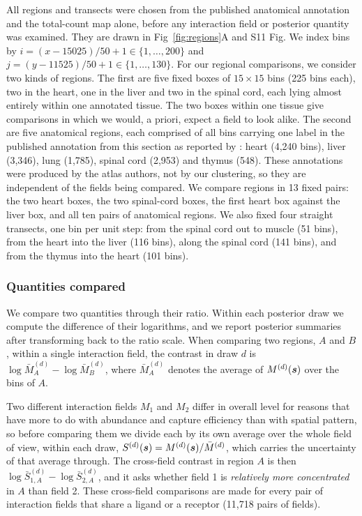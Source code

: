 \documentclass[10pt,letterpaper]{article}
\begin{document}
All regions and transects were chosen from the published anatomical annotation and the total-count map alone, before any interaction field or posterior quantity was examined. They are drawn in Fig~\ref{fig:regions}A and S11 Fig. We index bins by $i = (x - 15025)/50 + 1 \in \{1,\dots,200\}$ and $j = (y - 11525)/50 + 1 \in \{1,\dots,130\}$. For our regional comparisons, we consider two kinds of regions. The first are five fixed boxes of $15 \times 15$ bins (225 bins each), two in the heart, one in the liver and two in the spinal cord, each lying almost entirely within one annotated tissue. The two boxes within one tissue give comparisons in which we would, a priori, expect a field to look alike. The second are five anatomical regions, each comprised of all bins carrying one label in the published annotation from this section as reported by \cite{Chen2022}: heart (4,240 bins), liver (3,346), lung (1,785), spinal cord (2,953) and thymus (548). These annotations were produced by the atlas authors, not by our clustering, so they are independent of the fields being compared. We compare regions in 13 fixed pairs: the two heart boxes, the two spinal-cord boxes, the first heart box against the liver box, and all ten pairs of anatomical regions. We also fixed four straight transects, one bin per unit step: from the spinal cord out to muscle (51 bins), from the heart into the liver (116 bins), along the spinal cord (141 bins), and from the thymus into the heart (101 bins).

\subsubsection*{Quantities compared}

We compare two quantities through their ratio. Within each posterior draw we compute the difference of their logarithms, and we report posterior summaries after transforming back to the ratio scale. When comparing two regions, $A$ and $B$, within a single interaction field, the contrast in draw $d$ is $\log \bar{M}^{(d)}_A - \log \bar{M}^{(d)}_B$, where $\bar{M}^{(d)}_A$ denotes the average of $M^{(d)}(\mbox{\boldmath $s$})$ over the bins of $A$.

Two different interaction fields $M_1$ and $M_2$ differ in overall level for reasons that have more to do with abundance and capture efficiency than with spatial pattern, so before comparing them we divide each by its own average over the whole field of view, within each draw, $S^{(d)}(\mbox{\boldmath $s$}) = M^{(d)}(\mbox{\boldmath $s$}) / \bar{M}^{(d)}$, which carries the uncertainty of that average through. The cross-field contrast in region $A$ is then $\log \bar{S}^{(d)}_{1,A} - \log \bar{S}^{(d)}_{2,A}$, and it asks whether field 1 is \emph{relatively more concentrated} in $A$ than field 2. These cross-field comparisons are made for every pair of interaction fields that share a ligand or a receptor (11,718 pairs of fields).
\end{document}

